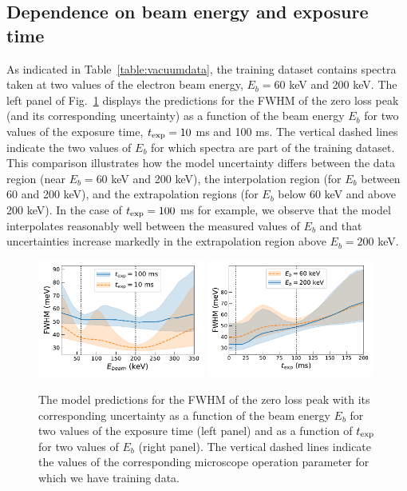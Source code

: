 \subsection{Dependence on beam energy and exposure time }
\label{eq:depebeam}

As indicated in Table~\ref{table:vacuumdata}, the training dataset contains
spectra taken at two values of the electron beam energy, $E_b=60$ keV and 200 keV.
%
The left panel of Fig.~\ref{fig:extrapolbeam} displays the predictions for the FWHM of the zero loss peak
(and its corresponding uncertainty) as a function of the beam energy $E_b$
for two values of the exposure time, $t_{\rm exp}=10$ ms and 100 ms.
%
The vertical dashed lines indicate the two values of $E_b$ for which spectra
are part of the training dataset.
%
This comparison illustrates how the model uncertainty differs between the data region
(near $E_b=60$ keV and 200 keV), the interpolation region (for $E_b$ between 60 and 200 keV),
and the extrapolation regions (for $E_b$ below 60 keV and above 200 keV).
%
In the case of $t_{\rm exp}=100$ ms for example, we observe that the model interpolates reasonably well
between the measured values of $E_b$ and that uncertainties increase
markedly in the extrapolation region above $E_b=200$ keV.
      
\begin{figure}[t]
    \centering
    \includegraphics[width=0.49\textwidth]{plots/Ebeam_extrapolation.pdf}
    \includegraphics[width=0.49\textwidth]{plots/time_extrapolation.pdf}
    \caption{\small The model predictions for the FWHM of the zero loss peak
      with its corresponding uncertainty as a function of the beam energy $E_b$
      for two values of the exposure time (left panel)
      and as a function of $t_{\rm exp}$ for two values of $E_b$ (right panel).
      The vertical dashed lines indicate the values of the
      corresponding microscope operation parameter for which we have training data.
    }
    \label{fig:extrapolbeam}
\end{figure}

